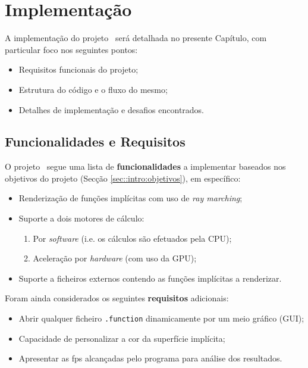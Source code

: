 \chapter{Implementação}
\label{ch::impl}


A implementação do projeto \theapp~será detalhada no presente Capítulo, com particular foco nos seguintes pontos:

\begin{itemize}[nosep]
	\item Requisitos funcionais do projeto;
	\item Estrutura do código e o fluxo do mesmo;
	\item Detalhes de implementação e desafios encontrados.
\end{itemize}


\section{Funcionalidades e Requisitos}
\label{sec::impl:requisitos}

O projeto \theapp~segue uma lista de \textbf{funcionalidades} a implementar baseados nos objetivos do projeto (Secção \ref{sec::intro:objetivos}), em específico:

\begin{itemize}
    \item Renderização de funções implícitas com uso de \textit{ray marching};
    \item Suporte a dois motores de cálculo:
    \begin{enumerate}[nosep]
        \item Por \textit{software} (i.e. os cálculos são efetuados pela \ac{CPU});
        \item Aceleração por \textit{hardware} (com uso da \ac{GPU});
    \end{enumerate}
    \item Suporte a ficheiros externos contendo as funções implícitas a renderizar.
\end{itemize}

Foram ainda considerados os seguintes \textbf{requisitos} adicionais:
\begin{itemize}
    \item Abrir qualquer ficheiro \verb*|.function| dinamicamente por um meio gráfico (\ac{GUI});
    \item Capacidade de personalizar a cor da superfície implícita;
    \item Apresentar as \ac{fps} alcançadas pelo programa para análise dos resultados.
\end{itemize}


